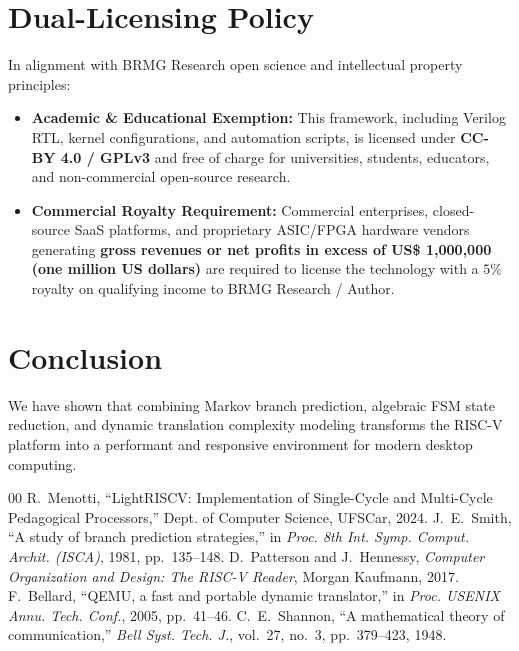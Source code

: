 \documentclass[10pt,twocolumn]{article}
\begin{document}
\section{Dual-Licensing Policy}

In alignment with BRMG Research open science and intellectual property principles:
\begin{itemize}
    \item \textbf{Academic \& Educational Exemption:} This framework, including Verilog RTL, kernel configurations, and automation scripts, is licensed under \textbf{CC-BY 4.0 / GPLv3} and free of charge for universities, students, educators, and non-commercial open-source research.
    \item \textbf{Commercial Royalty Requirement:} Commercial enterprises, closed-source SaaS platforms, and proprietary ASIC/FPGA hardware vendors generating \textbf{gross revenues or net profits in excess of US\$ 1,000,000 (one million US dollars)} are required to license the technology with a $5\%$ royalty on qualifying income to BRMG Research / Author.
\end{itemize}

\section{Conclusion}
We have shown that combining Markov branch prediction, algebraic FSM state reduction, and dynamic translation complexity modeling transforms the RISC-V platform into a performant and responsive environment for modern desktop computing.

\begin{thebibliography}{00}
 R.~Menotti, ``LightRISCV: Implementation of Single-Cycle and Multi-Cycle Pedagogical Processors,'' Dept. of Computer Science, UFSCar, 2024.
 J.~E.~Smith, ``A study of branch prediction strategies,'' in \emph{Proc. 8th Int. Symp. Comput. Archit. (ISCA)}, 1981, pp.~135--148.
 D.~Patterson and J.~Hennessy, \emph{Computer Organization and Design: The RISC-V Reader}, Morgan Kaufmann, 2017.
 F.~Bellard, ``QEMU, a fast and portable dynamic translator,'' in \emph{Proc. USENIX Annu. Tech. Conf.}, 2005, pp.~41--46.
 C.~E.~Shannon, ``A mathematical theory of communication,'' \emph{Bell Syst. Tech. J.}, vol.~27, no.~3, pp.~379--423, 1948.
\end{thebibliography}
\end{document}
